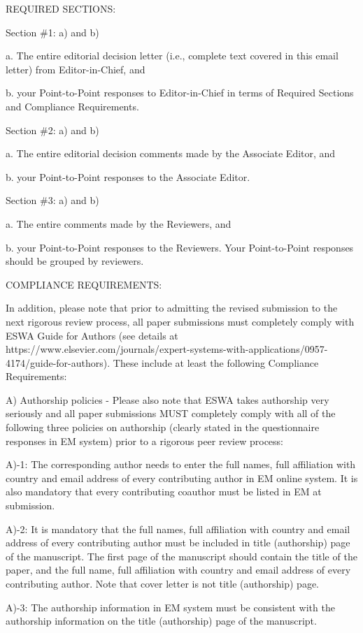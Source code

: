 \documentclass[12pt, review, authoryear]{elsarticle}
\newcounter{reviewer}
\begin{document}
REQUIRED SECTIONS: 

Section \#1: a) and b)

a.  The entire editorial decision letter (i.e., complete text covered in this email letter) from Editor-in-Chief, and 

b.  your Point-to-Point responses to Editor-in-Chief in terms of Required Sections and Compliance Requirements.  

Section \#2: a) and b)

a.  The entire editorial decision comments made by the Associate Editor, and 

b.  your Point-to-Point responses to the Associate Editor.  

Section \#3: a) and b)

a.  The entire comments made by the Reviewers, and 

b.  your Point-to-Point responses to the Reviewers. Your Point-to-Point responses should be grouped by reviewers.  

COMPLIANCE REQUIREMENTS: 

In addition, please note that prior to admitting the revised submission to the next rigorous review process, all paper submissions must completely comply with ESWA Guide for Authors (see details at {https://www.elsevier.com/journals/expert-systems-with-applications/0957-4174/guide-for-authors}).  These include at least the following Compliance Requirements:

A) Authorship policies - Please also note that ESWA takes authorship very seriously and all paper submissions MUST completely comply with all of the following three policies on authorship (clearly stated in the questionnaire responses in EM system) prior to a rigorous peer review process:

A)-1: The corresponding author needs to enter the full names, full affiliation with country and email address of every contributing author in EM online system.  It is also mandatory that every contributing coauthor must be listed in EM at submission.

A)-2: It is mandatory that the full names, full affiliation with country and email address of every contributing author must be included in title (authorship) page of the manuscript. The first page of the manuscript should contain the title of the paper, and the full name, full affiliation with country and email address of every contributing author. Note that cover letter is not title (authorship) page.  

A)-3: The authorship information in EM system must be consistent with the authorship information on the title (authorship) page of the manuscript.
\end{document}
